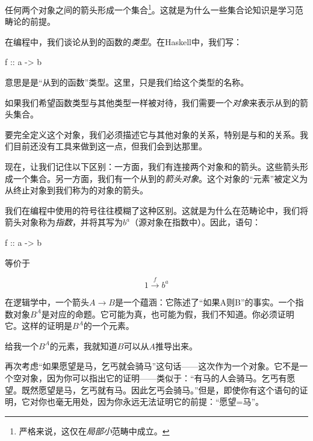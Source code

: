 \documentclass[DaoFP]{subfiles}
\begin{document}
任何两个对象之间的箭头形成一个集合\footnote{严格来说，这仅在\emph{局部小}范畴中成立。}。这就是为什么一些集合论知识是学习范畴论的前提。

在编程中，我们谈论从到的函数的\emph{类型}。在Haskell中，我们写：
\begin{haskell}
f :: a -> b
\end{haskell}
意思是是“从到的函数”类型。这里，只是我们给这个类型的名称。

如果我们希望函数类型与其他类型一样被对待，我们需要一个\emph{对象}来表示从到的箭头集合。

要完全定义这个对象，我们必须描述它与其他对象的关系，特别是与和的关系。我们目前还没有工具来做到这一点，但我们会到达那里。

现在，让我们记住以下区别：一方面，我们有连接两个对象和的箭头。这些箭头形成一个集合。另一方面，我们有一个从到的\emph{箭头对象}。这个对象的“元素”被定义为从终止对象\hask{()}到我们称为的对象的箭头。

我们在编程中使用的符号往往模糊了这种区别。这就是为什么在范畴论中，我们将箭头对象称为\emph{指数}，并将其写为$ b^a$（源对象在指数中）。因此，语句：
\begin{haskell}
f :: a -> b
\end{haskell}
等价于

\[ 1 \xrightarrow f b^a\]

在逻辑学中，一个箭头$ A \to B$是一个蕴涵：它陈述了“如果A则B”的事实。一个指数对象$ B^A$是对应的命题。它可能为真，也可能为假，我们不知道。你必须证明它。这样的证明是$ B^A$的一个元素。

给我一个$ B^A$的元素，我就知道$ B$可以从$ A$推导出来。

再次考虑“如果愿望是马，乞丐就会骑马”这句话——这次作为一个对象。它不是一个空对象，因为你可以指出它的证明——类似于：“有马的人会骑马。乞丐有愿望。既然愿望是马，乞丐就有马。因此乞丐会骑马。”但是，即使你有这个语句的证明，它对你也毫无用处，因为你永远无法证明它的前提：“愿望=马”。
\end{document}
